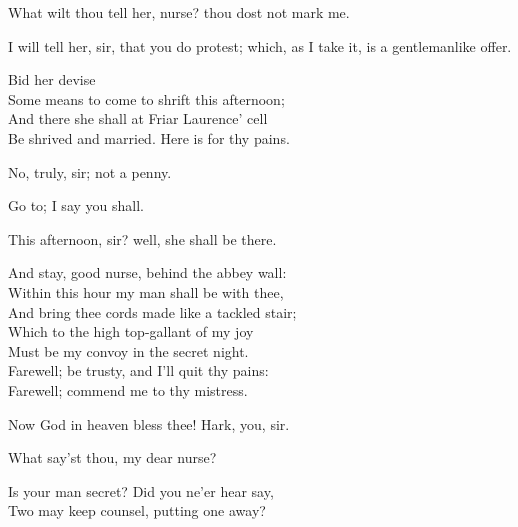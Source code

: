 \begin{speech}
What wilt thou tell her, nurse? thou
dost not mark me.
\end{speech}
\begin{speech}
I will tell her, sir, that you do protest;
which, as I take it, is a gentlemanlike
offer.
\end{speech}
\begin{speech}
Bid her devise \\
Some means to come to shrift this afternoon; \\
And there she shall at Friar Laurence' cell \\
Be shrived and married. Here is for thy pains. \\
\end{speech}
\begin{speech}
No, truly, sir; not a penny.
\end{speech}
\begin{speech}
Go to; I say you shall.
\end{speech}
\begin{speech}
This afternoon, sir? well, she shall
be there.
\end{speech}
\begin{speech}
And stay, good nurse, behind the abbey wall: \\
Within this hour my man shall be with thee, \\
And bring thee cords made like a tackled stair; \\
Which to the high top-gallant of my joy \\
Must be my convoy in the secret night. \\
Farewell; be trusty, and I'll quit thy pains: \\
Farewell; commend me to thy mistress. \\
\end{speech}
\begin{speech}
Now God in heaven bless thee! Hark, you, sir. \\

\end{speech}
\begin{speech}
What say'st thou, my dear nurse? \\
\end{speech}
\begin{speech}
Is your man secret?   Did you ne'er hear say, \\

Two may keep counsel, putting one away? \\
\end{speech}
